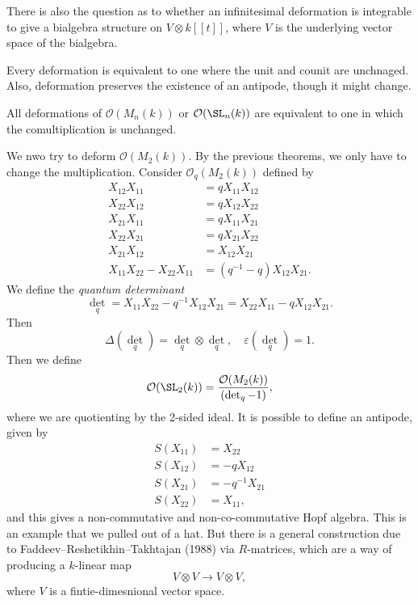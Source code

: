 \documentclass[a4paper]{article}
\begin{document}
There is also the question as to whether an infinitesimal deformation is integrable to give a bialgebra structure on $V \otimes k[[t]]$, where $V$ is the underlying vector space of the bialgebra.

\begin{thm}
  Every deformation is equivalent to one where the unit and counit are unchnaged. Also, deformation preserves the existence of an antipode, though it might change.
\end{thm}

\begin{thm}
  All deformations of $\mathcal{O}(M_n(k))$ or $\mathcal{O}(\SL_n(k))$ are equivalent to one in which the comultiplication is unchanged.
\end{thm}

We nwo try to deform $\mathcal{O}(M_2(k))$. By the previous theorems, we only have to change the multiplication. Consider $\mathcal{O}_q(M_2(k))$ defined by
\begin{align*}
  X_{12} X_{11} &= q X_{11} X_{12}\\
  X_{22} X_{12} &= q X_{12} X_{22}\\
  X_{21} X_{11} &= q X_{11} X_{21}\\
  X_{22} X_{21} &= q X_{21} X_{22}\\
  X_{21} X_{12} &= X_{12} X_{21}\\
  X_{11} X_{22} - X_{22} X_{11} &= (q^{-1} - q) X_{12} X_{21}.
\end{align*}
We define the \emph{quantum determinant}
\[
  \det_q = X_{11} X_{22} - q^{-1} X_{12} X_{21} = X_{22} X_{11} - q X_{12} X_{21}.
\]
Then
\[
  \Delta(\det_q) = \det_q \otimes \det_q,\quad \varepsilon (\det_q) = 1.
\]
Then we define
\[
  \mathcal{O}(\SL_2(k)) = \frac{\mathcal{O}(M_2(k))}{(\det_q - 1)},
\]
where we are quotienting by the 2-sided ideal. It is possible to define an antipode, given by
\begin{align*}
  S(X_{11}) &= X_{22}\\
  S(X_{12}) &= -q X_{12}\\
  S(X_{21}) &= -q^{-1} X_{21}\\
  S(X_{22}) &= X_{11},
\end{align*}
and this gives a non-commutative and non-co-commutative Hopf algebra. This is an example that we pulled out of a hat. But there is a general construction due to Faddeev--Reshetikhin--Takhtajan (1988) via $R$-matrices, which are a way of producing a $k$-linear map
\[
  V \otimes V \to V \otimes V,
\]
where $V$ is a fintie-dimesnional vector space.
\end{document}
